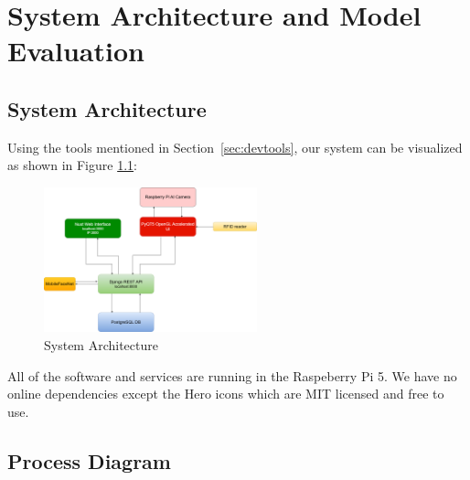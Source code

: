 \chapter{System Architecture and Model Evaluation}
\section{System Architecture}
Using the tools mentioned in Section~\ref{sec:devtools}, our system can be visualized as shown in Figure \ref{fig:architecture}: 
\begin{figure}[h] %
	\centering
	\includegraphics[width=0.55\textwidth]{figures/chapter4/architecture_new.png} %
	\caption{System Architecture}
	\label{fig:architecture}
\end{figure}
All of the software and services are running in the Raspeberry Pi 5. We have no online dependencies except the Hero icons which are MIT licensed and free to use.

\section{Process Diagram}

